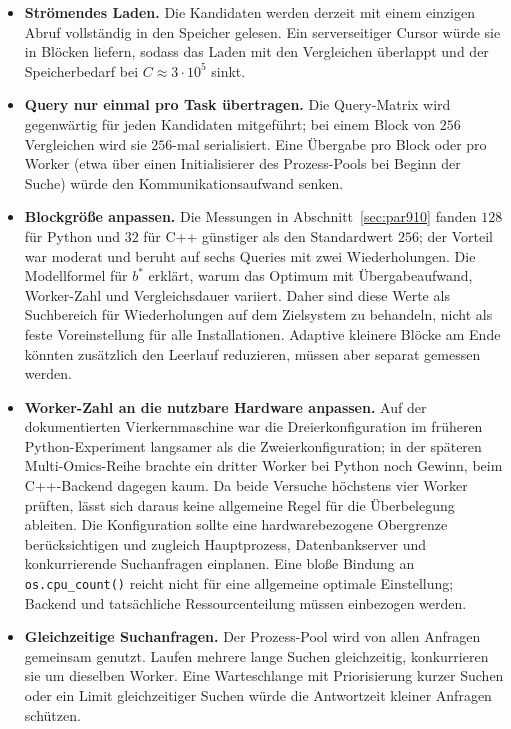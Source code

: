 \documentclass[a4paper,12pt, twoside]{report}
\theoremstyle{definition}
\begin{document}
\begin{itemize}
	\item \textbf{Strömendes Laden.} Die Kandidaten werden derzeit mit einem einzigen Abruf vollständig in den Speicher gelesen. Ein serverseitiger Cursor würde sie in Blöcken liefern, sodass das Laden mit den Vergleichen überlappt und der Speicherbedarf bei $C\approx 3\cdot 10^5$ sinkt.
	\item \textbf{Query nur einmal pro Task übertragen.} Die Query-Matrix wird gegenwärtig für jeden Kandidaten mitgeführt; bei einem Block von $256$ Vergleichen wird sie $256$-mal serialisiert. Eine Übergabe pro Block oder pro Worker (etwa über einen Initialisierer des Prozess-Pools bei Beginn der Suche) würde den Kommunikationsaufwand senken.
	\item \textbf{Blockgröße anpassen.} Die Messungen in Abschnitt~\ref{sec:par910} fanden $128$ für Python und $32$ für C++ günstiger als den Standardwert $256$; der Vorteil war moderat und beruht auf sechs Queries mit zwei Wiederholungen. Die Modellformel für $b^\ast$ erklärt, warum das Optimum mit Übergabeaufwand, Worker-Zahl und Vergleichsdauer variiert. Daher sind diese Werte als Suchbereich für Wiederholungen auf dem Zielsystem zu behandeln, nicht als feste Voreinstellung für alle Installationen. Adaptive kleinere Blöcke am Ende könnten zusätzlich den Leerlauf reduzieren, müssen aber separat gemessen werden.
	\item \textbf{Worker-Zahl an die nutzbare Hardware anpassen.} Auf der dokumentierten Vierkernmaschine war die Dreierkonfiguration im früheren Python-Experiment langsamer als die Zweierkonfiguration; in der späteren Multi-Omics-Reihe brachte ein dritter Worker bei Python noch Gewinn, beim C++-Backend dagegen kaum. Da beide Versuche höchstens vier Worker prüften, lässt sich daraus keine allgemeine Regel für die Überbelegung ableiten. Die Konfiguration sollte eine hardwarebezogene Obergrenze berücksichtigen und zugleich Hauptprozess, Datenbankserver und konkurrierende Suchanfragen einplanen. Eine bloße Bindung an \texttt{os.cpu\_count()} reicht nicht für eine allgemeine optimale Einstellung; Backend und tatsächliche Ressourcenteilung müssen einbezogen werden.
	\item \textbf{Gleichzeitige Suchanfragen.} Der Prozess-Pool wird von allen Anfragen gemeinsam genutzt. Laufen mehrere lange Suchen gleichzeitig, konkurrieren sie um dieselben Worker. Eine Warteschlange mit Priorisierung kurzer Suchen oder ein Limit gleichzeitiger Suchen würde die Antwortzeit kleiner Anfragen schützen.
\end{itemize}
\end{document}
